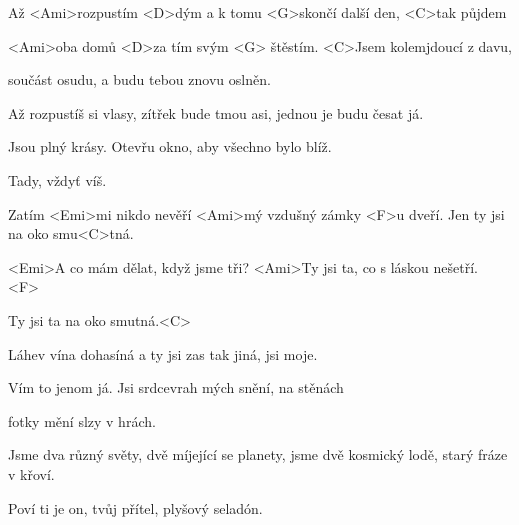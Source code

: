 

\zs
Až <Ami>rozpustím <D>dým a k tomu
<G>skončí další den, <C>tak půjdem

<Ami>oba domů <D>za tím svým <G>
štěstím. <C>Jsem kolemjdoucí z davu,

součást osudu, a budu
tebou znovu oslněn.
\ks

\zs
Až rozpustíš si vlasy, zítřek bude tmou
asi, jednou je budu česat já.

Jsou plný krásy. Otevřu okno,
aby všechno bylo blíž.

Tady, vždyť víš.
\ks


\zr \kr

\zs
Zatím <Emi>mi nikdo nevěří <Ami>mý vzdušný zámky
<F>u dveří. Jen ty jsi na oko smu<C>tná.

<Emi>A co mám dělat, když jsme tři? <Ami>Ty jsi ta, co s láskou 
nešetří. <F>

Ty jsi ta na oko smutná.<C>
\ks

\zs
Láhev vína dohasíná a ty jsi
zas tak jiná, jsi moje.

Vím to jenom já. Jsi srdcevrah
mých snění, na stěnách

fotky mění slzy v hrách.

\ks

\zr \kr

\zs
Jsme dva různý světy, dvě míjející se planety,
jsme dvě kosmický lodě, starý fráze v křoví.

Poví ti je on, tvůj přítel,
plyšový seladón.
\ks


\zr \kr

\kp
